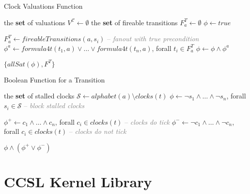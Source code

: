 \documentclass[11pt, oneside]{article}   	%
\begin{document}
\begin{algorithm}
\caption{Clock Valuations Function}
\label{alg:reachability}
\begin{algorithmic}
   the {\bf set} of valuations $V^\mathcal{C}\gets \emptyset$
     the {\bf set} of fireable transitions $F^T_a \gets \emptyset$
  \EndFor
   $\phi \gets true$

    \State $F^T_a \gets fireableTransitions(a, s_i)$ \textcolor{gray}{-- \em fanout with true precondition}
    \State $\phi^a \gets formula4t(t_1, a) \lor \ldots \lor formula4t(t_n, a)$, forall $t_i \in F^T_a$
    \State $\phi \gets \phi \land \phi^a$
  \EndFor

\State\Return $\{allSat(\phi), F^T\}$
\EndFunction
\end{algorithmic}
\end{algorithm}


\begin{algorithm}
\caption{Boolean Function for a Transition}
\label{alg:reachability}
\begin{algorithmic}
   the {\bf set} of stalled clocks $\mathcal{S} \gets alphabet(a) \setminus clocks(t)$
  \State $\phi \gets \lnot s_1 \land \ldots \land \lnot s_n $, forall $s_i \in \mathcal{S}$  \textcolor{gray}{-- \em block stalled clocks}

  \State $\phi^+ \gets c_1 \land \ldots \land c_n$, forall $c_i \in clocks(t)$ \textcolor{gray}{-- \em clocks do tick}
    \State $\phi^- \gets \lnot c_1 \land \ldots \land \lnot c_n$, forall $c_i \in clocks(t)$ \textcolor{gray}{-- \em clocks do not tick}
  \EndIf

\State\Return $\phi \land (\phi^+ \lor \phi^-)$
\EndFunction
\end{algorithmic}
\end{algorithm}


\section{CCSL Kernel Library}
\end{document}

